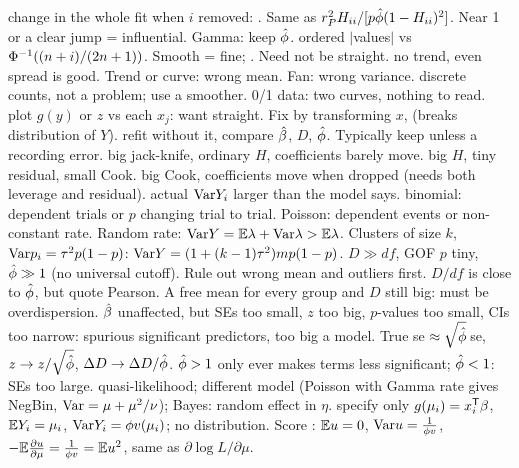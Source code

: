 \sk{} change in the whole fit when $i$ removed: . Same as $r_P^2H_{ii}/[p\hat{\phi}(1-H_{ii})^2]$. Near 1 or a clear jump = influential. Gamma: keep $\hat{\phi}$.
\sk{} ordered $|$values$|$ vs $\Phi^{-1}((n+i)/(2n+1))$. Smooth = fine; . Need not be straight.
\sk{} no trend, even spread is good. Trend or curve: wrong mean. Fan: wrong variance.  discrete counts, not a problem; use a smoother. 0/1 data: two curves, nothing to read.
\sk{} plot $g(y)$ or $z$ vs each $x_j$: want straight. Fix by transforming $x$,  (breaks distribution of $Y$).
\sk{} refit without it, compare $\hat{\beta}$, $D$, $\hat{\phi}$. Typically keep unless a recording error.
\sk{}  big jack-knife, ordinary $H$, coefficients barely move.  big $H$, tiny residual, small Cook.  big Cook, coefficients move when dropped (needs both leverage and residual).
 actual $\mathrm{Var} Y_i$ larger than the model says.  binomial: dependent trials or $p$ changing trial to trial. Poisson: dependent events or non-constant rate. Random rate: $\mathrm{Var} Y=\mathbb{E}\lambda+\mathrm{Var}\lambda>\mathbb{E}\lambda$. Clusters of size $k$, $\mathrm{Var} p_i=\tau^2p(1-p)$: $\mathrm{Var} Y=(1+(k-1)\tau^2)mp(1-p)$.
\sk{} $D\gg df$, GOF $p$ tiny, $\hat{\phi}\gg1$ (no universal cutoff). Rule out wrong mean and outliers first. $D/df$ is close to $\hat{\phi}$, but quote Pearson. A free mean for every group and $D$ still big: must be overdispersion. 
\sk{} $\hat{\beta}$ unaffected, but SEs too small, $z$ too big, $p$-values too small, CIs too narrow: spurious significant predictors, too big a model. True se $\approx\sqrt{\hat{\phi}}\,$se, $z\to z/\sqrt{\hat{\phi}}$, $\Delta D\to\Delta D/\hat{\phi}$. $\hat{\phi}>1$ only ever makes terms less significant; $\hat{\phi}<1$: SEs too large.
\sk{} quasi-likelihood; different model (Poisson with Gamma rate gives NegBin, $\mathrm{Var}=\mu+\mu^2/\nu$); Bayes: random effect in $\eta$.
\sk{} specify only $g(\mu_i)=x_i^{\mathsf T}\beta$, $\mathbb{E} Y_i=\mu_i$, $\mathrm{Var} Y_i=\phi v(\mu_i)$; no distribution. Score : $\mathbb{E} u=0$, $\mathrm{Var} u=\frac1{\phi v}$, $-\mathbb{E}\frac{\partial u}{\partial\mu}=\frac1{\phi v}=\mathbb{E} u^2$, same as $\partial\log L/\partial\mu$.
